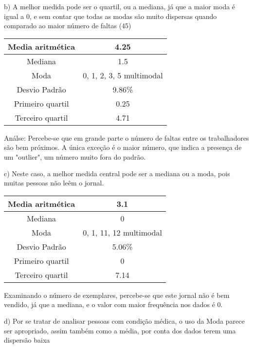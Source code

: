 \documentclass[12pt]{article}
\begin{document}
    b) A melhor medida pode ser o quartil, ou a mediana, já que a maior moda é igual a 0,
    e sem contar que todas as modas são muito dispersas quando comparado ao maior número de faltas (45)

    \begin{center}
        \begin{tabular}{|c | c |} 
        \hline
        Media aritmética & 4.25 \\ 
        \hline
        Mediana & 1.5 \\ 
        \hline
        Moda & 0, 1, 2, 3, 5 multimodal \\ 
        \hline
        Desvio Padrão & 9.86\% \\ 
        \hline
        Primeiro quartil & 0.25 \\ 
        \hline
        Terceiro quartil & 4.71 \\ 
        \hline
       \end{tabular}
    \end{center}

    Análse: Percebe-se que em grande parte o número de faltas entre os trabalhadores são bem próximos.
    A única exceção é o maior número, que indica a presença de um "outlier", um número muito fora do padrão.

    c) Neste caso, a melhor medida central pode ser a mediana ou a moda, pois muitas 
    pessoas não leêm o jornal. 

    \begin{center}
        \begin{tabular}{|c | c |} 
        \hline
        Media aritmética & 3.1 \\ 
        \hline
        Mediana & 0 \\ 
        \hline
        Moda & 0, 1, 11, 12 multimodal \\ 
        \hline
        Desvio Padrão & 5.06\% \\ 
        \hline
        Primeiro quartil & 0 \\ 
        \hline
        Terceiro quartil & 7.14 \\ 
        \hline
       \end{tabular}
    \end{center}

    Examinando o número de exemplares, percebe-se que este jornal não é bem vendido, 
    já que a mediana, e o valor com maior frequência nos dados é 0.

    \newpage

    d) Por se tratar de analisar pessoas com condição médica, o uso da Moda parece ser
    apropriado, assim também como a média, por conta dos dados terem uma dispersão baixa
\end{document}
